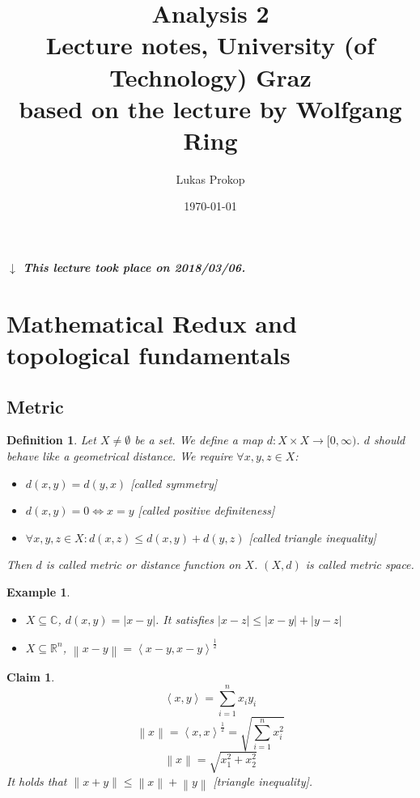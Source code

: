 \documentclass{article}
\title{
  Analysis 2 \\
  \large{Lecture notes, University (of Technology) Graz} \\
  based on the lecture by Wolfgang Ring
}
\date{\today}
\author{Lukas Prokop}
\newtheorem{example}{Example}  \numberwithin{example}{section}
\newtheorem{definition}{Definition}  \numberwithin{definition}{section}
\newtheorem*{claim}{Claim}%
\newcommand{\angel}[1]{\left\langle#1\right\rangle}
\newcommand{\norm}[1]{\left\|#1\right\|}
\newcommand{\card}[1]{\left|#1\right|}
\newcommand{\dateref}[1]{%
  \begin{mdframed}[backgroundcolor=gray!10,innerbottommargin=0pt,innertopmargin=0pt]
    \paragraph{\textit{$\downarrow$ This lecture took place on #1.}}%
  \end{mdframed}%
}
\begin{document}
\maketitle
\tableofcontents

\dateref{2018/03/06}

\section{Mathematical Redux and topological fundamentals}
\subsection{Metric}

\begin{definition}
  Let $X \neq \emptyset$ be a set. We define a map $d: X \times X \to [0,\infty)$.
  $d$ should behave like a geometrical distance. We require $\forall x, y, z \in X$:
  \begin{itemize}
    \item $d(x, y) = d(y, x)$ [called \emph{symmetry}]
    \item $d(x, y) = 0 \iff x = y$ [called \emph{positive definiteness}]
    \item $\forall x,y,z \in X: d(x, z) \leq d(x, y) + d(y, z)$ [called \emph{triangle inequality}]
  \end{itemize}
  Then $d$ is called \emph{metric} or \emph{distance function} on $X$.
  $(X, d)$ is called \emph{metric space}.
\end{definition}

\begin{example}
  \begin{itemize}\hfill{}
    \item $X \subseteq \mathbb C$, $d(x, y) = \card{x - y}$.
          It satisfies $\card{x - z} \leq \card{x - y} + \card{y - z}$
    \item $X \subseteq \mathbb R^n$, $\norm{x - y} = \angel{x - y, x - y}^{\frac12}$
  \end{itemize}
\end{example}

\begin{claim}
  \[ \angel{x, y} = \sum_{i=1}^n x_i y_i \]
  \[ \norm{x} = \angel{x,x}^{\frac12} = \sqrt{\sum_{i=1}^n x_i^2} \]
  \[ \norm{x} = \sqrt{x_1^2 + x_2^2} \]
  It holds that $\norm{x+y} \leq \norm{x} + \norm{y}$ [triangle inequality].
\end{claim}
\end{document}
